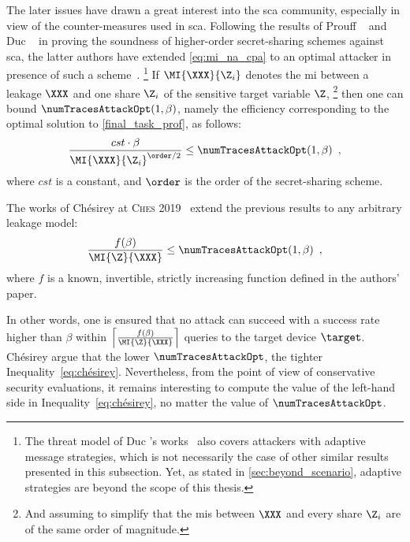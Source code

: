 The later issues have drawn a great interest into the \gls{sca} community, especially in view of the counter-measures used in \gls{sca}.
Following the results of Prouff \etal{}~\cite{prouff_masking_2013} and Duc \etal{}~\cite{duc_unifying_2019} in proving the soundness of higher-order secret-sharing schemes against \gls{sca}, the latter authors have extended \autoref{eq:mi_na_cpa} to an optimal attacker in presence of such a scheme~\cite[Eq.~18]{duc_making_2019}.%
\footnote{
    The threat model of Duc \etal{}'s works~\cite{duc_making_2019,duc_making_2019} also covers attackers with adaptive message strategies, which is not necessarily the case of other similar results presented in this subsection.
    Yet, as stated in \autoref{sec:beyond_scenario}, adaptive strategies are beyond the scope of this thesis.
}
If \(\MI{\XXX}{\Z_i}\) denotes the \gls{mi} between a leakage \(\XXX\) and one share \(\Z_i\) of the sensitive target variable \(\Z\),%
\footnote{
    And assuming to simplify that the \glspl{mi} between \(\XXX\) and every share \(\Z_i\) are of the same order of magnitude.
}
then one can bound \(\numTracesAttackOpt(1, \beta)\), namely the efficiency corresponding to the optimal solution to \autoref{final_task_prof}, as follows:
\begin{equation}
    \frac{cst \cdot \beta}{\MI{\XXX}{\Z_i}^{\order/2}} \leq \numTracesAttackOpt(1, \beta) \enspace ,
\end{equation}
where \(cst\) is a constant, and \(\order\) is the order of the secret-sharing scheme.

The works of Chésirey \etal{} at \textsc{Ches} 2019~\cite{chesirey_best_2019} extend the previous results to any arbitrary leakage model:
\begin{equation}
    \frac{f(\beta)}{\MI{\Z}{\XXX}} \leq \numTracesAttackOpt(1, \beta) \enspace ,
    \label{eq:chésirey}
\end{equation}
where \(f\) is a known, invertible, strictly increasing function defined in the authors' paper.

In other words, one is ensured that no attack can succeed with a success rate higher than \(\beta\) within \(\left\lceil \frac{f(\beta)}{\MI{\Z}{\XXX}} \right\rceil\) queries to the target device \(\target\).
Chésirey \etal{} argue that the lower \(\numTracesAttackOpt\), the tighter Inequality~\eqref{eq:chésirey}.
Nevertheless, from the point of view of conservative security evaluations, it remains interesting to compute the value of the left-hand side in Inequality~\eqref{eq:chésirey}, no matter the value of \(\numTracesAttackOpt\).

